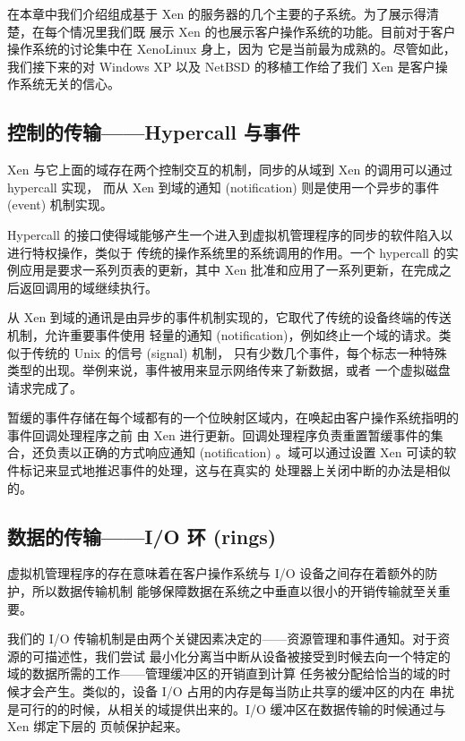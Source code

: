 在本章中我们介绍组成基于 Xen 的服务器的几个主要的子系统。为了展示得清楚，在每个情况里我们既
展示 Xen 的也展示客户操作系统的功能。目前对于客户操作系统的讨论集中在 XenoLinux 身上，因为
它是当前最为成熟的。尽管如此，我们接下来的对 Windows XP 以及 NetBSD 的移植工作给了我们 Xen
是客户操作系统无关的信心。

\subsection{控制的传输——Hypercall 与事件}

Xen 与它上面的域存在两个控制交互的机制，同步的从域到 Xen 的调用可以通过 hypercall 实现，
而从 Xen 到域的通知 (notification) 则是使用一个异步的事件 (event) 机制实现。

Hypercall 的接口使得域能够产生一个进入到虚拟机管理程序的同步的软件陷入以进行特权操作，类似于
传统的操作系统里的系统调用的作用。一个 hypercall 的实例应用是要求一系列页表的更新，其中 Xen
批准和应用了一系列更新，在完成之后返回调用的域继续执行。

从 Xen 到域的通讯是由异步的事件机制实现的，它取代了传统的设备终端的传送机制，允许重要事件使用
轻量的通知 (notification)，例如终止一个域的请求。类似于传统的 Unix 的信号 (signal) 机制，
只有少数几个事件，每个标志一种特殊类型的出现。举例来说，事件被用来显示网络传来了新数据，或者
一个虚拟磁盘请求完成了。

暂缓的事件存储在每个域都有的一个位映射区域内，在唤起由客户操作系统指明的事件回调处理程序之前
由 Xen 进行更新。回调处理程序负责重置暂缓事件的集合，还负责以正确的方式响应通知
(notification) 。域可以通过设置 Xen 可读的软件标记来显式地推迟事件的处理，这与在真实的
处理器上关闭中断的办法是相似的。

\subsection{数据的传输——I/O 环 (rings)}

虚拟机管理程序的存在意味着在客户操作系统与 I/O 设备之间存在着额外的防护，所以数据传输机制
能够保障数据在系统之中垂直以很小的开销传输就至关重要。

我们的 I/O 传输机制是由两个关键因素决定的——资源管理和事件通知。对于资源的可描述性，我们尝试
最小化分离当中断从设备被接受到时候去向一个特定的域的数据所需的工作——管理缓冲区的开销直到计算
任务被分配给恰当的域的时候才会产生。类似的，设备 I/O 占用的内存是每当防止共享的缓冲区的内在
串扰是可行的的时候，从相关的域提供出来的。I/O 缓冲区在数据传输的时候通过与 Xen 绑定下层的
页帧保护起来。

